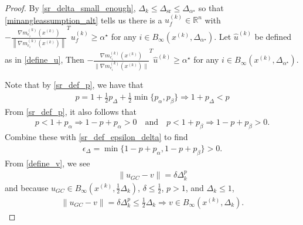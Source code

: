 \documentclass{article}
\theoremstyle{case}
\numberwithin{theorem}{subsection}
\newcommand{\dk}{\Delta_k}
\newcommand{\dsr}{{\Delta_{\textrm{sr}}}}
\newcommand{\gmcik}{{\nabla m_{c_i}^{(k)}\left(\xk\right)}}
\newcommand{\huk}{{{\hat u}^{(k)}}}
\newcommand{\minanglealpha}{{ \alpha^{\star} }}
\newcommand{\minangledelta}{{\Delta_{\alpha^{\star}}}}
\newcommand{\Rn}{\mathbb R^n}
\newcommand{\tr}{{ B_{\infty}\left(\xk, \dk\right) }}
\newcommand{\xk}{x^{(k)}}
\newcommand{\minangledirk}{{u^{(k)}_f}}
\begin{document}
\begin{proof}
By \cref{sr_delta_small_enough}, $\dk \le \dsr \le \minangledelta$ so that \cref{minangleassumption_alt}
tells us there is a $ \minangledirk \in \Rn$ with
$-\frac {\gmcik}{\left\|\gmcik\right\|} ^T \minangledirk \ge \minanglealpha$ for any $i \in B_{\infty}\left(\xk, \minangledelta\right)$.
Let $\huk$ be defined as in \cref{define_u},
Then $-\frac {\gmcik}{\|\gmcik\|} ^T\huk \ge \minanglealpha$ for any $i \in B_{\infty}\left(\xk, \minangledelta\right)$.

Note that by \cref{sr_def_p}, we have that
\begin{align}
p = 1 + \frac 1 2 p_{\Delta} + \frac 1 2 \min\{p_{\alpha}, p_{\beta} \} \Longrightarrow 1 + p_{\Delta} < p \label{sr_p_big}
\end{align}
From \cref{sr_def_p}, it also follows that
\begin{align}
p < 1 + p_{\alpha} \Longrightarrow 1 - p + p_{\alpha} > 0   \quad \textrm{and} \quad
p < 1 + p_{\beta}\Longrightarrow 1 - p + p_{\beta} > 0. \label{sr_p_small_alpha_beta}
\end{align}
Combine these with \cref{sr_def_epsilon_delta} to find
\begin{align}
\epsilon_{\Delta} = \min\{1 - p + p_{\alpha}, 1 - p + p_{\beta} \} > 0 \label{sr_epsilon_delta_positive}.
\end{align}
From \cref{define_v}, we see
\begin{align}
\|u_{GC} - v\| = \delta \dk^{p} \label{sr_v_close_u}
\end{align}
and because $u_{GC} \in B_{\infty}(\xk, \frac 1 2 \dk)$, $\delta \le \frac 1 2 $, $p > 1$, and $\dk \le 1$,
\begin{align*}
\|u_{GC} - v\| = \delta \dk^{p} \le \frac 1 2\dk \Longrightarrow v \in \tr.
\end{align*}



\end{proof}
\end{document}
